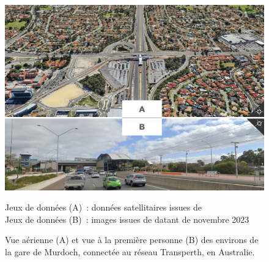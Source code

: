 \begin{refsegment}
    \begin{figure}[h!]\vspace*{4pt}
        \caption{Vue aérienne (A) et vue à la première personne (B) des environs de la gare de Murdoch, connectée au réseau Transperth, en Australie.}
        \label{fig-chap1:tad-murdoch}
        \centerline{\includegraphics[width=1\columnwidth]{src/Figures/Chap-1/Murdoch.jpg}}
        \vspace{5pt}
        \begin{flushright}\scriptsize{
        Jeux de données (A)~: données satellitaires issues de \textcolor{blue}{\textcite{google_earth_google_2023}}
        \\
        Jeux de données (B)~: images issues de  datant de novembre 2023
        }\end{flushright}
    \end{figure}


\end{refsegment}
